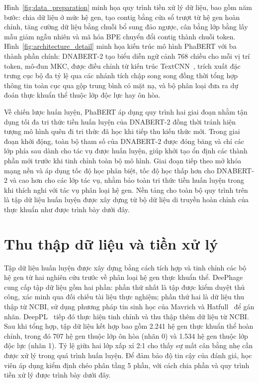 Hình~\ref{fig:data_preparation} minh họa quy trình tiền xử lý dữ liệu, bao gồm năm bước: chia dữ liệu ở mức hệ gen, tạo contig bằng cửa sổ trượt từ hệ gen hoàn chỉnh, tăng cường dữ liệu bằng chuỗi bổ sung đảo ngược, cân bằng lớp bằng lấy mẫu giảm ngẫu nhiên và mã hóa BPE chuyển đổi contig thành chuỗi token. Hình~\ref{fig:architecture_detail} minh họa kiến trúc mô hình PhaBERT với ba thành phần chính: DNABERT-2 tạo biểu diễn ngữ cảnh 768 chiều cho mỗi vị trí token, mô-đun MKC, được điều chỉnh từ kiến trúc TextCNN~\cite{kim2014convolutional}, trích xuất đặc trưng cục bộ đa tỷ lệ qua các nhánh tích chập song song đồng thời tổng hợp thông tin toàn cục qua gộp trung bình có mặt nạ, và bộ phân loại đưa ra dự đoán thực khuẩn thể thuộc lớp độc lực hay ôn hòa.

Về chiến lược huấn luyện, PhaBERT áp dụng quy trình hai giai đoạn nhằm tận dụng tối đa tri thức tiền huấn luyện của DNABERT-2 đồng thời tránh hiện tượng mô hình quên đi tri thức đã học khi tiếp thu kiến thức mới. Trong giai đoạn khởi động, toàn bộ tham số của DNABERT-2 được đóng băng và chỉ các lớp phía sau dành cho tác vụ được huấn luyện, giúp khởi tạo ổn định các thành phần mới trước khi tinh chỉnh toàn bộ mô hình. Giai đoạn tiếp theo mở khóa mạng nền và áp dụng tốc độ học phân biệt, tốc độ học thấp hơn cho DNABERT-2 và cao hơn cho các lớp tác vụ, nhằm bảo toàn tri thức tiền huấn luyện trong khi thích nghi với tác vụ phân loại hệ gen. Nền tảng cho toàn bộ quy trình trên là tập dữ liệu huấn luyện được xây dựng từ bộ dữ liệu di truyền hoàn chỉnh của thực khuẩn như được trình bày dưới đây.

\section{Thu thập dữ liệu và tiền xử lý}
\label{sec:data_preprocessing}

Tập dữ liệu huấn luyện được xây dựng bằng cách tích hợp và tinh chỉnh các bộ hệ gen từ hai nghiên cứu trước về phân loại hệ gen thực khuẩn thể. DeePhage~\cite{wu2021deephage} cung cấp tập dữ liệu gồm hai phần: phần thứ nhất là tập được kiểm duyệt thủ công, xác minh qua đối chiếu tài liệu thực nghiệm; phần thứ hai là dữ liệu thu thập từ NCBI, sử dụng phương pháp tin sinh học của Mavrich và Hatfull~\cite{mavrich2017bacteriophage} để gán nhãn. DeepPL~\cite{zhang2024deeppl} tiếp đó thực hiện tinh chỉnh và thu thập thêm dữ liệu từ NCBI. Sau khi tổng hợp, tập dữ liệu kết hợp bao gồm 2.241 hệ gen thực khuẩn thể hoàn chỉnh, trong đó 707 hệ gen thuộc lớp ôn hòa (nhãn 0) và 1.534 hệ gen thuộc lớp độc lực (nhãn 1). Tỷ lệ giữa hai lớp xấp xỉ 2:1 cho thấy sự mất cân bằng nhẹ cần được xử lý trong quá trình huấn luyện. Để đảm bảo độ tin cậy của đánh giá, học viên áp dụng kiểm định chéo phân tầng 5 phần, với cách chia phần và quy trình tiền xử lý được trình bày dưới đây.


